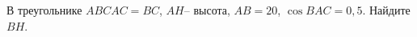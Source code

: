 \begin{ex}
	\begin{condition}
		В треугольнике \(ABC AC=BC\), \( AH – \) высота, \( AB=20 \),  \( \cos BAC=0,5 \). Найдите \( BH \).
	\end{condition}
\end{ex}